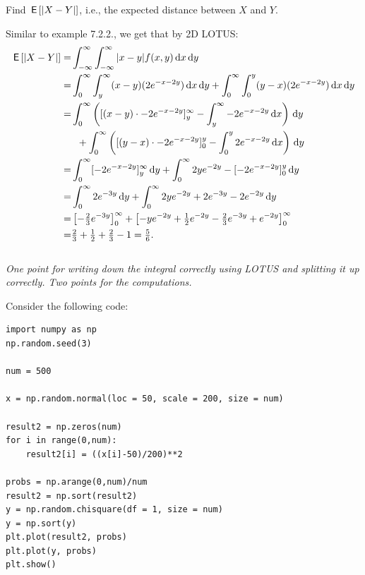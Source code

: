 \begin{exercise}[3]
Find $\,\mathsf{E}\left[|X-Y|\right]$, i.e., the expected distance between $X$ and $Y$.
\begin{solution}
    Similar to example 7.2.2., we get that by 2D LOTUS:
    \begin{align*}
    \,\mathsf{E}\left[|X-Y|\right] =& \int_{-\infty}^\infty \int_{-\infty}^\infty |x-y| f(x,y) \,\textrm{d}x \,\textrm{d}y \\
    =& \int_0^\infty \int_y^\infty (x-y)  (2e^{-x-2y}) \,\textrm{d}x \,\textrm{d}y + \int_0^\infty \int_0^y (y-x) (2e^{-x-2y}) \,\textrm{d}x \,\textrm{d}y \\
    =& \int_0^\infty \left( [(x-y) \cdot -2e^{-x-2y}]_y^\infty - \int_y^\infty - 2e^{-x-2y} \,\textrm{d}x \right) \,\textrm{d}y \\ &\;\;+ \int_0^\infty  \left( [(y-x) \cdot -2e^{-x-2y}]_0^y - \int_0^y 2e^{-x-2y} \,\textrm{d}x \right) \,\textrm{d}y \\
    =& \int_0^\infty  [-2e^{-x-2y}]_y^\infty \,\textrm{d}y + \int_0^\infty 2y e^{-2y} - [-2e^{-x-2y}]_0^y  \,\textrm{d}y \\
    =& \int_0^\infty  2e^{-3y} \,\textrm{d}y + \int_0^\infty 2y e^{-2y} + 2e^{-3y} - 2e^{-2y} \,\textrm{d}y \\
    =&  \left[-\tfrac23 e^{-3y}\right]_0^\infty + \left[-y e^{-2y} + \tfrac12 e^{-2y} -  \tfrac23 e^{-3y} + e^{-2y}\right]_0^\infty \\
    =& \tfrac23 + \tfrac12 + \tfrac23 - 1
    = \tfrac{5}{6}.
    \end{align*}\\
\textit{One point for writing down the integral correctly using LOTUS and splitting it up correctly. Two points for the computations.}
\end{solution}
\end{exercise}
\noindent Consider the following code:
\begin{verbatim}
import numpy as np
np.random.seed(3)

num = 500

x = np.random.normal(loc = 50, scale = 200, size = num)

result2 = np.zeros(num)
for i in range(0,num):
    result2[i] = ((x[i]-50)/200)**2

probs = np.arange(0,num)/num
result2 = np.sort(result2)
y = np.random.chisquare(df = 1, size = num)
y = np.sort(y)
plt.plot(result2, probs)
plt.plot(y, probs)
plt.show()

\end{verbatim}

